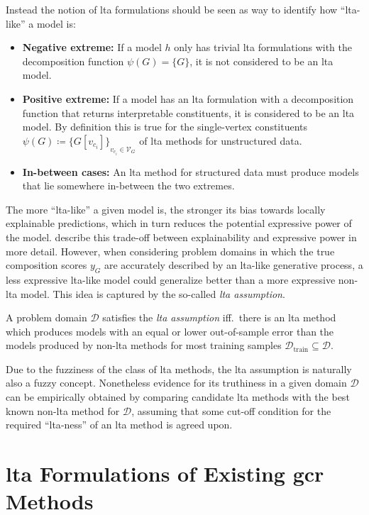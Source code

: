 Instead the notion of \ac{lta} formulations should be seen as way to identify how ``\acs{lta}-like'' a model is:
\begin{itemize}
	\item \textbf{Negative extreme:}
		If a model $h$ only has trivial \ac{lta} formulations with the decomposition function $\psi(G) = \{ G \}$, it is not considered to be an \ac{lta} model.
	\item \textbf{Positive extreme:}
		If a model has an \ac{lta} formulation with a decomposition function that returns interpretable constituents, it is considered to be an \ac{lta} model.
		By definition this is true for the single-vertex constituents $\psi(G) \coloneqq {\{ G[v_{c_i}] \}}_{v_{c_i} \in \mathcal{V}_G}$ of \ac{lta} methods for unstructured data.
	\item \textbf{In-between cases:}
		An \ac{lta} method for structured data must produce models that lie somewhere in-between the two extremes.
\end{itemize}

The more ``\acs{lta}-like'' a given model is, the stronger its bias towards locally explainable predictions, which in turn reduces the potential expressive power of the model.
\citet{Gilpin2018} describe this trade-off between explainability and expressive power in more detail.
However, when considering problem domains in which the true composition scores $y_G$ are accurately described by an \acs{lta}-like generative process, a less expressive \ac{lta}-like model could generalize better than a more expressive non-\ac{lta} model.
This idea is captured by the so-called \textit{\ac{lta} assumption}.
\begin{defn}
	A problem domain $\mathcal{D}$ satisfies the \textit{\ac{lta} assumption} iff.\ there is an \ac{lta} method which produces models with an equal or lower out-of-sample error than the models produced by non-\acs{lta} methods for most training samples $\mathcal{D}_{\text{train}} \subseteq \mathcal{D}$.
\end{defn}
Due to the fuzziness of the class of \ac{lta} methods, the \ac{lta} assumption is naturally also a fuzzy concept.
Nonetheless evidence for its truthiness in a given domain $\mathcal{D}$ can be empirically obtained by comparing candidate \ac{lta} methods with the best known non-\ac{lta} method for $\mathcal{D}$, assuming that some cut-off condition for the required ``\ac{lta}-ness'' of an \ac{lta} method is agreed upon.

\section{\acs*{lta} Formulations of Existing \acs*{gcr} Methods}%
\label{sec:ltag:formulation}

